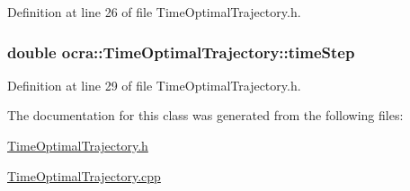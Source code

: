 Definition at line 26 of file Time\+Optimal\+Trajectory.\+h.

\subsubsection[{\texorpdfstring{time\+Step}{timeStep}}]{\setlength{\rightskip}{0pt plus 5cm}double ocra\+::\+Time\+Optimal\+Trajectory\+::time\+Step\hspace{0.3cm}{\ttfamily [protected]}}\hypertarget{classocra_1_1TimeOptimalTrajectory_aacee4e110122959c3f47c07a9b7796bf}{}\label{classocra_1_1TimeOptimalTrajectory_aacee4e110122959c3f47c07a9b7796bf}


Definition at line 29 of file Time\+Optimal\+Trajectory.\+h.



The documentation for this class was generated from the following files\+:\begin{DoxyCompactItemize}
\item 
\hyperlink{TimeOptimalTrajectory_8h}{Time\+Optimal\+Trajectory.\+h}\item 
\hyperlink{TimeOptimalTrajectory_8cpp}{Time\+Optimal\+Trajectory.\+cpp}\end{DoxyCompactItemize}
